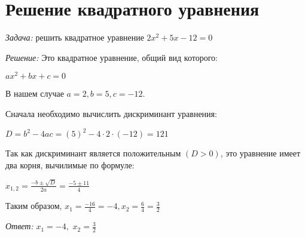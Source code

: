\documentclass{article}
\begin{document}
\section{Решение квадратного уравнения}
\large\textit{Задача:} решить квадратное уравнение $2x^{2}+5x-12=0$

\textit{Решение:} Это квадратное уравнение, общий вид которого:
    
        \begin{center}
        $
        ax^{2}+bx+c=0
        $
        \end{center}
\begin{flushleft}
\large В нашем случае $a = 2, b = 5, c = -12$.
\end{flushleft}

Сначала необходимо вычислить дискриминант уравнения:
\begin{center}
$
D = b^{2}-4ac=(5)^{2}-4\cdot2\cdot(-12)=121
$
\end{center}
\begin{flushleft}
    Так как дискриминант является положительным $(D > 0)$, это уравнение имеет два корня, вычилимые по формуле:
\end{flushleft}
\begin{center}
    \Large
    $
    x_{1,2} = \frac{-b \pm \sqrt{D}}{2a} = \frac{-5 \pm 11}{4}
    $
\end{center}
\begin{flushleft}
    Таким образом, $ x_1 = \frac{-16}{4} = -4, x_2 = \frac{6}{4} = \frac{3}{2} $
\end{flushleft}

    \textit{Ответ:} $x_1 =-4,$ $x_2=\frac{3}{2}$
\end{document}

